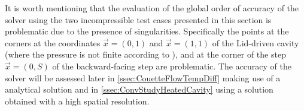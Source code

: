It is worth mentioning that the evaluation of the global order of accuracy of the solver using the two incompressible test cases presented in this section is problematic due to the presence of singularities. Specifically the points at the corners at the coordinates $ \vec{x} = (0,1)$ and $\vec{x} =(1,1)$ of the Lid-driven cavity (where the pressure is not finite according to \textcite{botellaBenchmarkSpectralResults1998}), and at the corner of the step $\vec{x} = (0,S)$ of the backward-facing step are problematic. The accuracy of the solver will be assessed later in \cref{ssec:CouetteFlowTempDiff} making use of a analytical solution and in \cref{ssec:ConvStudyHeatedCavity} using a solution obtained with a high spatial resolution.
